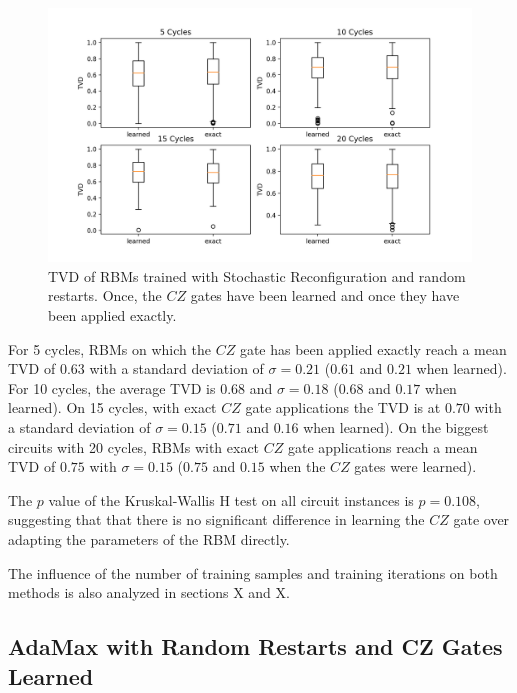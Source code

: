 \begin{figure}[H]
    \centering
    \includegraphics[width=\textwidth]{figures/sr_learned.png}
    \caption[Comparison methods to apply the $CZ$ gate]{TVD of RBMs trained with 
    Stochastic Reconfiguration and random restarts. Once, the $CZ$ gates have been learned and once they have been applied exactly.}
    \label{fig:sr_learned}
  \end{figure}

For 5 cycles, RBMs on which the $CZ$ gate has been applied exactly reach a mean TVD of $0.63$ with a standard deviation of
$\sigma=0.21$ ($0.61$ and $0.21$ when learned). For 10 cycles, the average TVD is $0.68$ and
$\sigma=0.18$ ($0.68$ and $0.17$ when learned). On 15 cycles, with exact $CZ$ gate applications the TVD is at $0.70$ with a standard deviation of $\sigma=0.15$
($0.71$ and $0.16$ when learned). On the biggest circuits with 20 cycles, RBMs with exact $CZ$ gate applications
 reach a mean TVD of $0.75$ with $\sigma=0.15$ ($0.75$ and $0.15$ when the $CZ$ gates were learned).

The $p$ value of the Kruskal-Wallis H test on all circuit instances is $p=0.108$, suggesting that 
that there is no significant difference in learning the $CZ$ gate over adapting the parameters of the 
RBM directly.

The influence of the number of training samples and training iterations on both methods is also analyzed in 
sections X and X.
\fi
\subsection{AdaMax with Random Restarts and CZ Gates Learned}

